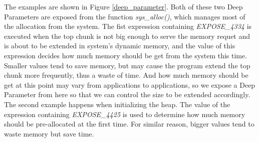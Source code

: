 The examples are shown in Figure \ref{deep_parameter}. Both of these two Deep Parameters are exposed from the function \emph{sys\_alloc()}, which manages most of the allocation from the system. The fist expression containing \emph{EXPOSE\_4334} is executed when the top chunk is not big enough to serve the memory requet and is about to be extended in system's dynamic memory, and the value of this expression decides how much memory should be get from the system this time. Smaller values tend to save memory, but may cause the program extend the top chunk more frequently, thus a waste of time. And how much memory should be get at this point may vary from applications to applications, so we expose a Deep Parameter from here so that we can control the size to be extended accordingly. The second example happens when initializing the heap. The value of the expression containing \emph{EXPOSE\_4425} is used to determine how much memory should be pre-allocated at the first time. For similar reason, bigger values tend to waste memory but save time.
\\
